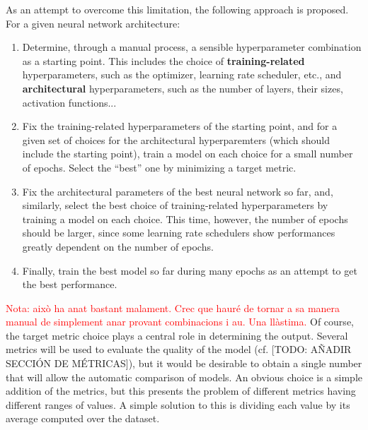 \documentclass[twocolumn,twoside,a4paper,10pt]{IEEEtran}
\newcommand{\Frank}[1]{\textcolor{red}{#1}}
\begin{document}
As an attempt to overcome this limitation, the following approach is proposed. For a given neural network architecture:
\begin{enumerate}
  \item Determine, through a manual process, a sensible hyperparameter combination as a starting point. This includes the choice of \textbf{training-related} hyperparameters, such as the optimizer, learning rate scheduler, etc., and \textbf{architectural} hyperparameters, such as the number of layers, their sizes, activation functions...
  \item Fix the training-related hyperparameters of the starting point, and for a given set of choices for the architectural hyperparemters (which should include the starting point), train a model on each choice for a small number of epochs. Select the ``best'' one by minimizing a target metric.
  \item Fix the architectural parameters of the best neural network so far, and, similarly, select the best choice of training-related hyperparameters by training a model on each choice. This time, however, the number of epochs should be larger, since some learning rate schedulers show performances greatly dependent on the number of epochs.
  \item Finally, train the best model so far during many epochs as an attempt to get the best performance.
\end{enumerate}
\Frank{Nota: això ha anat bastant malament. Crec que hauré de tornar a sa manera manual de simplement anar provant combinacions i au. Una llàstima.}
Of course, the target metric choice plays a central role in determining the output. Several metrics will be used to evaluate the quality of the model (cf. [TODO: AÑADIR SECCIÓN DE MÉTRICAS]), but it would be desirable to obtain a single number that will allow the automatic comparison of models. An obvious choice is a simple addition of the metrics, but this presents the problem of different metrics having different ranges of values. A simple solution to this
is dividing each value by its average computed over the dataset.
\end{document}
